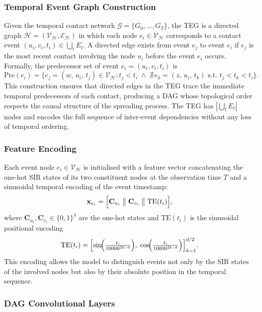 \subsubsection{Temporal Event Graph Construction}
\label{sssec:teg-construction}

Given the temporal contact network $\mathcal{G} = \{G_0, \ldots, G_T\}$, the TEG is a directed graph $\mathcal{H} = (\mathcal{V}_{\mathcal{H}}, \mathcal{E}_{\mathcal{H}})$ in which each node $e_i \in \mathcal{V}_{\mathcal{H}}$ corresponds to a contact event $(u_i, v_i, t_i) \in \bigcup_t E_t$. A directed edge exists from event $e_j$ to event $e_i$ if $e_j$ is the most recent contact involving the node $u_i$ before the event $e_i$ occurs. Formally, the predecessor set of event $e_i = (u_i, v_i, t_i)$ is
\[
    \mathrm{Pre}(e_i) = \bigl\{e_j = (w,\, u_i,\, t_j) \in \mathcal{V}_{\mathcal{H}} : t_j < t_i \;\wedge\; \nexists\, e_k = (z,\, u_i,\, t_k)\text{ s.t. }t_j < t_k < t_i\bigr\}.
\]
This construction ensures that directed edges in the TEG trace the immediate temporal predecessors of each contact, producing a DAG whose topological order respects the causal structure of the spreading process. The TEG has $|\bigcup_t E_t|$ nodes and encodes the full sequence of inter-event dependencies without any loss of temporal ordering.

\subsubsection{Feature Encoding}
\label{sssec:teg-features}

Each event node $e_i \in \mathcal{V}_{\mathcal{H}}$ is initialised with a feature vector concatenating the one-hot SIR states of its two constituent nodes at the observation time $T$ and a sinusoidal temporal encoding of the event timestamp:
\[
    \mathbf{x}_{e_i} = \Bigl[\mathbf{C}_{u_i} \;\big\|\; \mathbf{C}_{v_i} \;\big\|\; \mathrm{TE}(t_i)\Bigr],
\]
where $\mathbf{C}_{u_i}, \mathbf{C}_{v_i} \in \{0,1\}^3$ are the one-hot states and $\mathrm{TE}(t_i)$ is the sinusoidal positional encoding
\[
    \mathrm{TE}(t_i) = \Bigl[\sin\!\Bigl(\tfrac{t_i}{10000^{2k/d}}\Bigr),\; \cos\!\Bigl(\tfrac{t_i}{10000^{2k/d}}\Bigr)\Bigr]_{k=1}^{d/2}.
\]
This encoding allows the model to distinguish events not only by the SIR states of the involved nodes but also by their absolute position in the temporal sequence.

\subsubsection{DAG Convolutional Layers}
\label{sssec:dag-layers}

